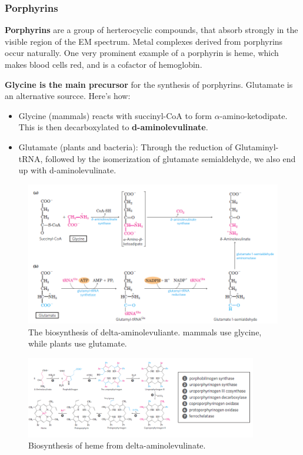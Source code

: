 \documentclass[../main.tex]{subfiles}
\begin{document}
\subsubsection{Porphyrins}

\textbf{\gls{Porphyrins}} are a group of herterocyclic compounds, that absorb strongly in the visible region of the EM spectrum. Metal complexes derived from porphyrins occur naturally. One very prominent example of a porphyrin is heme, which makes blood cells red, and is a cofactor of hemoglobin.

\textbf{Glycine is the main precursor} for the synthesis of porphyrins. Glutamate is an alternative sourcce. Here's how:
\begin{itemize}
	\item Glycine (mammals) reacts with succinyl-CoA to form $\alpha$-amino-ketodipate. This is then decarboxylated to \textbf{\gls{d-aminolevulinate}}.
	\item Glutamate (plants and bacteria): Through the reduction of Glutaminyl-tRNA, followed by the isomerization of glutamate semialdehyde, we also end up with d-aminolevulinate.
\end{itemize}

\begin{figure}[H]
	\centering
	\includegraphics[width=0.7\linewidth]{por_glyglu}
	\caption{The biosynthesis of delta-aminolevuliante. mammals use glycine, while plants use glutamate.}
	\label{fig:porglyglu}
\end{figure}

\begin{figure}[H]
	\centering
	\includegraphics[width=0.9\textwidth]{por_synth}
	\caption{Biosynthesis of heme from delta-aminolevulinate.}
	\label{fig:porsynth}
\end{figure}
\end{document}
